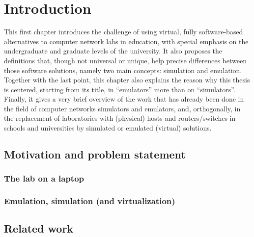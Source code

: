 
\chapter{Introduction}
\label{ch:introduction}

This first chapter introduces the challenge of using virtual, fully software-based alternatives to computer network labs in education, with special emphasis on the undergraduate and graduate levels of the university. %
It also proposes the definitions that, though not universal or unique, help precise differences between those software solutions, namely two main concepts: simulation and emulation. %
Together with the last point, this chapter also explains the reason why this thesis is centered, starting from its title, in ``emulators'' more than on ``simulators''.
Finally, it gives a very brief overview of the work that has already been done in the field of computer networks simulators and emulators, and, orthogonally, in the replacement of laboratories with (physical) hosts and routers/switches in schools and universities by simulated or emulated (virtual) solutions.


\section{Motivation and problem statement}
\label{sec:motivation}

\subsection{The lab on a laptop}
\label{subsec:replacingthelab}


\subsection{Emulation, simulation (and virtualization)}
\label{subsec:emulsimvirt}



\section{Related work}
\label{sec:relatedwork}

